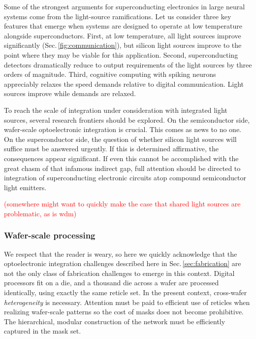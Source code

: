 \documentclass[twocolumn]{article}
\begin{document}
Some of the strongest arguments for superconducting electronics in large neural systems come from the light-source ramifications. Let us consider three key features that emerge when systems are designed to operate at low temperature alongside superconductors. First, at low temperature, all light sources improve significantly (Sec.\,\ref{fig:communication}), but silicon light sources improve to the point where they may be viable for this application. Second, superconducting detectors dramatically reduce to output requirements of the light sources by three orders of magnitude. Third, cognitive computing with spiking neurons appreciably relaxes the speed demands relative to digital communication. Light sources improve while demands are relaxed. 

To reach the scale of integration under consideration with integrated light sources, several research frontiers should be explored. On the semiconductor side, wafer-scale optoelectronic integration is crucial. This comes as news to no one. On the superconductor side, the question of whether silicon light sources will suffice must be answered urgently. If this is determined affirmative, the consequences appear significant. If even this cannot be accomplished with the great chasm of that infamous indirect gap, full attention should be directed to integration of superconducting electronic circuits atop compound semiconductor light emitters.

\textcolor{red}{(somewhere might want to quickly make the case that shared light sources are problematic, as is wdm)}

\subsubsection{Wafer-scale processing}
We respect that the reader is weary, so here we quickly acknowledge that the optoelectronic integration challenges described here in Sec.\,\ref{sec:fabrication} are not the only class of fabrication challenges to emerge in this context. Digital processors fit on a die, and a thousand die across a wafer are processed identically, using exactly the same reticle set. In the present context, cross-wafer \textit{heterogeneity} is necessary. Attention must be paid to efficient use of reticles when realizing wafer-scale patterns so the cost of masks does not become prohibitive. The hierarchical, modular construction of the network \cite{} must be efficiently captured in the mask set.

\end{document}
